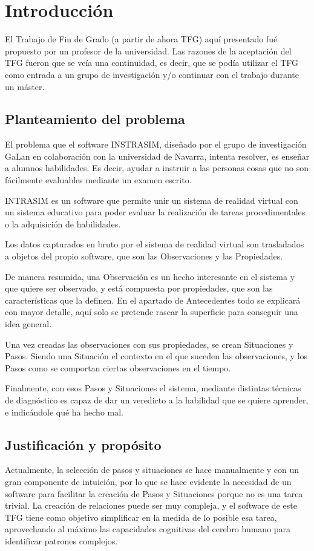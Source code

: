\chapter{Introducci\'{o}n} 
El Trabajo de Fin de Grado (a partir de ahora TFG) aqu\'{i} presentado fu\'{e} propuesto por un profesor de la universidad.
Las razones de la aceptaci\'{o}n del TFG fueron que se ve\'{i}a una continuidad, es decir, que se pod\'{i}a 
utilizar el TFG como entrada a un grupo de investigaci\'{o}n y/o continuar con el trabajo durante un m\'{a}ster.

\section{Planteamiento del problema}
El problema que el software INSTRASIM, dise\~nado por el grupo de investigaci\'on GaLan en colaboraci\'on
con la universidad de Navarra, intenta resolver, es ense\~nar a alumnos habilidades. Es decir, ayudar a 
instruir a las personas cosas que no son f\'acilmente evaluables mediante un examen escrito.

INTRASIM es un software que permite unir un sistema
de realidad virtual con un sistema educativo para poder evaluar la realizaci\'on de tareas procedimentales 
o la adquisici\'on de habilidades.

Los datos capturados en bruto por el sistema de realidad virtual son trasladados a objetos del propio software,
que son las Observaciones y las Propiedades.

De manera resumida, una Observaci\'on es un hecho interesante en el sistema y que quiere ser observado, y 
est\'a compuesta por propiedades, que son las caracter\'isticas que la definen. En el 
apartado de Antecedentes todo se explicar\'a con mayor detalle, aqu\'i solo se pretende rascar la superficie para 
conseguir una idea general.

Una vez creadas las observaciones con sus propiedades, se crean Situaciones y Pasos. Siendo una Situaci\'on el contexto
en el que suceden las observaciones, y los Pasos como se comportan ciertas observaciones en el tiempo.

Finalmente, con esos Pasos y Situaciones el sistema, mediante distintas t\'ecnicas de diagn\'ostico 
es capaz de dar un veredicto
a la habilidad que se quiere aprender, e indic\'andole qu\'e ha hecho mal.

\section{Justificaci\'{o}n y prop\'osito}
Actualmente, la selecci\'on de pasos y situaciones se hace manualmente y con un gran componente de intuici\'on,
por lo que se hace evidente la necesidad de un software para facilitar la creaci\'on de Pasos y Situaciones porque
no es una tarea trivial. La creaci\'on de relaciones puede ser muy compleja, y el software de este TFG
tiene como objetivo simplificar en la medida de lo posible esa tarea, aprovechando al m\'aximo las capacidades
cognitivas del cerebro humano para identificar
patrones complejos. 


